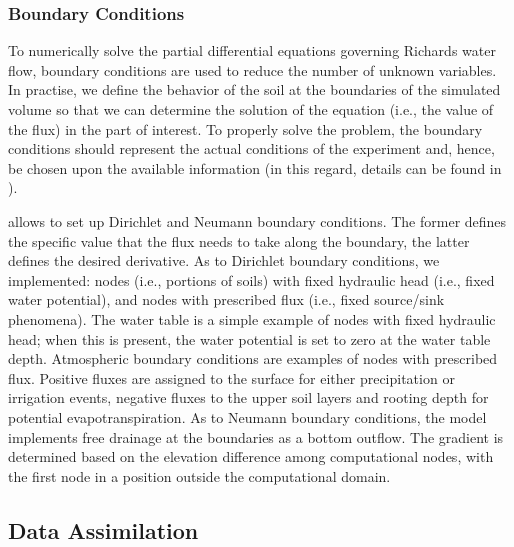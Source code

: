 \subsubsection{Boundary Conditions}
\label{orchard-sec:boundary}
To numerically solve the partial differential equations governing Richards water flow, boundary conditions are used to reduce the number of unknown variables.
In practise, we define the behavior of the soil at the boundaries of the simulated volume so that we can determine the solution of the equation (i.e., the value of the flux) in the part of interest.
To properly solve the problem, the boundary conditions should represent the actual conditions of the experiment and, hence, be chosen upon the available information (in this regard, details can be found in \cite{bittelli-etal-2015}). 

\olab{} allows to set up Dirichlet and Neumann boundary conditions.
The former defines the specific value that the flux needs to take along the boundary, the latter defines the desired derivative.
As to Dirichlet boundary conditions, we implemented: nodes (i.e., portions of soils) with fixed hydraulic head (i.e., fixed water potential), and nodes with prescribed flux (i.e., fixed source/sink phenomena). 
The water table is a simple example of nodes with fixed hydraulic head; when this is present, the water potential is set to zero at the water table depth. 
Atmospheric boundary conditions are examples of nodes with prescribed flux.
Positive fluxes are assigned to the surface for either precipitation or irrigation events, negative fluxes to the upper soil layers and rooting depth for potential evapotranspiration.
As to Neumann boundary conditions, the model implements free drainage at the boundaries as a bottom outflow.
The gradient is determined based on the elevation difference among computational nodes,
with the first node in a position outside the computational domain. 

\subsection{Data Assimilation}\label{orchard-ssec:ass}

